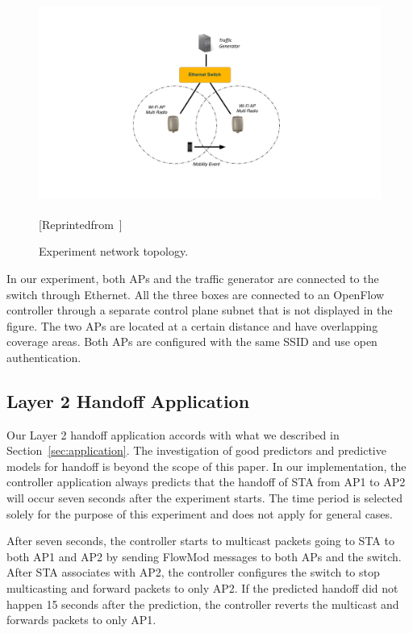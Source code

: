 \begin{figure}
\centering
\includegraphics[width=1.0\textwidth]{figures/topology}
\caption[\aetherflow experiment network topology]{\aetherflow Experiment network topology.}{[Reprinted\space from\space \textsuperscript{\cite{flowgrammable}}]}
\label{fig:topology}
\end{figure}

In our experiment, both APs and the traffic generator are connected to the switch
through  Ethernet. All the three boxes are connected to an OpenFlow
controller through a separate control plane subnet that is not displayed in the
figure.  The two APs are located at a certain distance and have overlapping coverage areas.  Both APs are configured with
the same SSID and use open authentication. 

\subsection{Layer 2 Handoff Application}
Our Layer 2 handoff application accords with what we described in
Section~\ref{sec:application}. The investigation of good
predictors and predictive models for handoff is beyond the scope of this paper.
In our implementation, the controller application always predicts that the
handoff of STA from AP1 to AP2 will occur seven seconds after the experiment starts.
The time period is selected solely for the purpose of this experiment and
does not apply for general cases. 
 
After seven seconds, the controller starts to multicast packets going to STA to both
AP1 and AP2 by sending FlowMod messages to both APs and the switch. After STA
associates with AP2, the controller configures the switch to stop multicasting
and forward packets to only AP2. If the predicted handoff did not happen 15
seconds after the prediction, the controller reverts the multicast and forwards
packets to only AP1.




